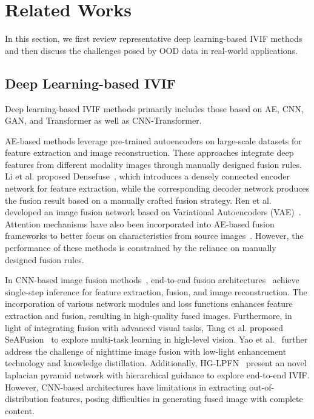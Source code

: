 \section{Related Works}
In this section, we first review representative deep learning-based IVIF methods and then discuss the challenges posed by OOD data in real-world applications.

\subsection{Deep Learning-based IVIF}
Deep learning-based IVIF methods primarily includes those based on AE, CNN, GAN, and Transformer as well as CNN-Transformer.

AE-based methods leverage pre-trained autoencoders on large-scale datasets for feature extraction and image reconstruction. These approaches integrate deep features from different modality images through manually designed fusion rules. Li et al. proposed Densefuse~\cite{li2018densefuse}, which introduces a densely connected encoder network for feature extraction, while the corresponding decoder network produces the fusion result based on a manually crafted fusion strategy. Ren et al. developed an image fusion network based on Variational Autoencoders (VAE)~\cite{ren2021infrared}. Attention mechanisms have also been incorporated into AE-based fusion frameworks to better focus on characteristics from source images~\cite{liu2021learning}. However, the performance of these methods is constrained by the reliance on manually designed fusion rules.

In CNN-based image fusion methods~\cite{liu2020bilevel, zhang2020ifcnn, zhang2021sdnet, li2021rfn, xian2024crose}, end-to-end fusion architectures~\cite{li2021rfn, zhang2021sdnet} achieve single-step inference for feature extraction, fusion, and image reconstruction. The incorporation of various network modules and loss functions enhances feature extraction and fusion, resulting in high-quality fused images. Furthermore, in light of integrating fusion with advanced visual tasks, Tang et al. proposed SeAFusion~\cite{tang2022image} to explore multi-task learning in high-level vision. Yao et al.~\cite{yao2025color} further address the challenge of nighttime image fusion with low-light enhancement technology and knowledge distillation. Additionally, HG-LPFN~\cite{yao2023laplacian} present an novel laplacian pyramid network with hierarchical guidance to explore end-to-end IVIF. However, CNN-based architectures have limitations in extracting out-of-distribution features, posing difficulties in generating fused image with complete content.

